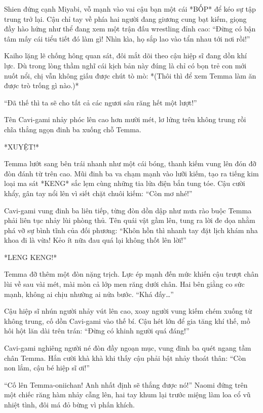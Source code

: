 \documentclass[../main.tex]{subfiles}
\begin{document}
Shien đứng cạnh Miyabi, vỗ mạnh vào vai cậu bạn một cái *BỐP* để kéo sự tập trung trở lại. Cậu chỉ tay về phía hai người đang giương cung bạt kiếm, giọng đầy hào hứng như thể đang xem một trận đấu wrestling đỉnh cao: ``Đừng có bận tâm mấy cái tiểu tiết đó làm gì! Nhìn kìa, họ sắp lao vào tẩn nhau tới nơi rồi!''

Kaiho lặng lẽ chống hông quan sát, đôi mắt dõi theo cậu hiệp sĩ đang dồn khí lực. Dù trong lòng thầm nghĩ cái kịch bản này đúng là chỉ có bọn trẻ con mới nuốt nổi, chị vẫn không giấu được chút tò mò: *(Thôi thì để xem Temma làm ăn được trò trống gì nào.)*

``Đã thế thì ta sẽ cho tất cả các ngươi sâu răng hết một lượt!''

Tên Cavi-gami nhảy phóc lên cao hơn mười mét, lơ lửng trên không trung rồi chĩa thẳng ngọn đinh ba xuống chỗ Temma.

*XUYỆT!*

Temma lướt sang bên trái nhanh như một cái bóng, thanh kiếm vung lên đón đỡ đòn đánh từ trên cao. Mũi đinh ba va chạm mạnh vào lưỡi kiếm, tạo ra tiếng kim loại ma sát *KENG* sắc lẹm cùng những tia lửa điện bắn tung tóe. Cậu cười khẩy, gân tay nổi lên vì siết chặt chuôi kiếm: ``Còn mơ nhé!''

Cavi-gami vung đinh ba liên tiếp, từng đòn dồn dập như mưa rào buộc Temma phải liên tục nhảy lùi phòng thủ. Tên quái vật gầm lên, tung ra lời đe dọa nhằm phá vỡ sự bình tĩnh của đối phương: ``Khôn hồn thì nhanh tay đặt lịch khám nha khoa đi là vừa! Kẻo ít nữa đau quá lại không thốt lên lời!''

*LENG KENG!*

Temma đỡ thêm một đòn nặng trịch. Lực ép mạnh đến mức khiến cậu trượt chân lùi về sau vài mét, mài mòn cả lớp men răng dưới chân. Hai bên giằng co sức mạnh, không ai chịu nhường ai nửa bước. ``Khá đấy\dots''

Cậu hiệp sĩ nhún người nhảy vút lên cao, xoay người vung kiếm chém xuống từ không trung, cố dồn Cavi-gami vào thế bí. Cậu hét lớn để gia tăng khí thế, mồ hôi hột lăn dài trên trán: ``Đừng có khinh người quá đáng!''

Cavi-gami nghiêng người né đòn đầy ngoạn mục, vung đinh ba quét ngang tầm chân Temma. Hắn cười khà khà khi thấy cậu phải bật nhảy thoát thân: ``Còn non lắm, cậu bé hiệp sĩ ơi!''

``Cố lên Temma-oniichan! Anh nhất định sẽ thắng được nó!'' Naomi đứng trên một chiếc răng hàm nhảy cẫng lên, hai tay khum lại trước miệng làm loa cổ vũ nhiệt tình, đôi má đỏ bừng vì phấn khích.
\end{document}

